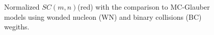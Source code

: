 	\begin{figure}[h]
		\begin{center}
        \caption{Normalized $SC(m,n)$(red) with the comparison to MC-Glauber models using wonded nucleon (WN) and binary collisions (BC) wegiths.}
        \label{fig:results_ecen}
        \end{center}   
     \end{figure}



